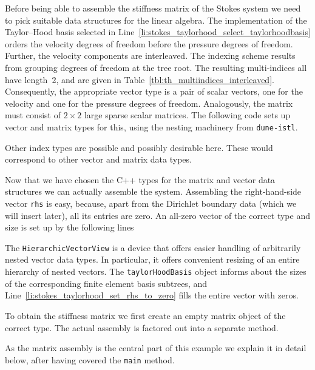 \documentclass[a4paper,10pt,headings=normal,bibliography=totoc]{scrartcl}
\newcommand{\cpp}[1]{\lstinline[basicstyle=\ttfamily]!#1!}
\newcommand{\dunemodule}[1]{\texttt{#1}}
\begin{document}
Before being able to assemble the stiffness matrix of the Stokes system we need to pick suitable data structures
for the linear algebra.
The implementation of the Taylor--Hood basis selected in Line~\ref{li:stokes_taylorhood_select_taylorhoodbasis} orders the
velocity degrees of freedom before the pressure degrees of freedom.  Further, the velocity
components are interleaved.  The indexing scheme results from grouping degrees of freedom at the
tree root.  The resulting multi-indices all have length~2, and are given in Table~\ref{tbl:th_multiindices_interleaved}.
Consequently, the appropriate vector type is a pair of scalar vectors, one for the velocity and one for the pressure
degrees of freedom.  Analogously, the matrix must consist of $2 \times 2$ large sparse scalar matrices.
The following code sets up vector and matrix types for this, using the nesting machinery from \dunemodule{dune-istl}.
%

%
Other index types are possible and possibly desirable here.  These would correspond to other vector and
matrix data types.

Now that we have chosen the C++ types for the matrix and vector data structures we can actually assemble the system.
Assembling the right-hand-side vector \cpp{rhs} is easy, because, apart from the Dirichlet boundary data (which we
will insert later), all its entries are zero.  An all-zero vector of the correct type and size is set up by the
following lines
%

%
The \cpp{HierarchicVectorView} is a device that offers easier handling of arbitrarily nested vector data types.
In particular, it offers convenient resizing of an entire hierarchy of nested vectors.
The \cpp{taylorHoodBasis} object informs about the sizes of the corresponding finite element basis subtrees,
and Line~\ref{li:stokes_taylorhood_set_rhs_to_zero} fills the entire vector with zeros.

To obtain the stiffness matrix we first create an empty matrix object of the correct type.  The actual assembly
is factored out into a separate method.
%

%
As the matrix assembly is the central part of this example we explain it in detail below, after having covered the \cpp{main} method.
\end{document}
